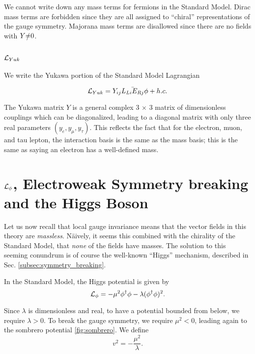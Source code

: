 We cannot write down any mass terms for fermions in the Standard Model.
Dirac mass terms are forbidden since they are all assigned to ``chiral'' representations of the gauge symmetry.
Majorana mass terms are disallowed since there are no fields with $Y \slashed{=} 0$.

\subsection{$\mathcal{L}_{Yuk}$ }

We write the Yukawa portion of the Standard Model Lagrangian

\begin{equation}
\mathcal{L}_{Yuk} = Y_{ij}\bar{L_{Li} E_{Rj}} \phi + h.c.
\end{equation}

The Yukawa matrix $Y$ is a general complex 3 $\times$ 3 matrix of dimensionless couplings which can be diagonalized, leading to a diagonal matrix with only three real parameters $(y_e , y_\mu , y_\tau)$.
This reflects the fact that for the electron, muon, and tau lepton, the interaction basis is the same as the mass basis; this is the same as saying an electron has a well-defined mass.

\section{$\mathcal{L}_\phi$, Electroweak Symmetry breaking and the Higgs Boson}

Let us now recall that local gauge invariance means that the vector fields in this theory are \textit{massless}.
N\"aively, it seems this combined with the chirality of the Standard Model, that \textit{none} of the fields have masses.
The solution to this seeming conundrum is of course the well-known ``Higgs'' mechanism, described in Sec. \ref{subsec:symmetry_breaking}.

In the Standard Model, the Higgs potential is given by
\begin{equation} \label{eq:higgs_potential}
\mathcal{L}_\phi = -\mu^2 \phi^\dagger \phi - \lambda (\phi^\dagger \phi)^2.
\end{equation}

Since $\lambda$ is dimensionless and real, to have a potential bounded from below, we require $\lambda > 0$.
To break the gauge symmetry, we require $\mu^2 < 0$, leading again to the sombrero potential \ref{fig:sombrero}.
We define
\begin{equation}
v^2 = - \frac{\mu^2}{\lambda}.
\end{equation}


